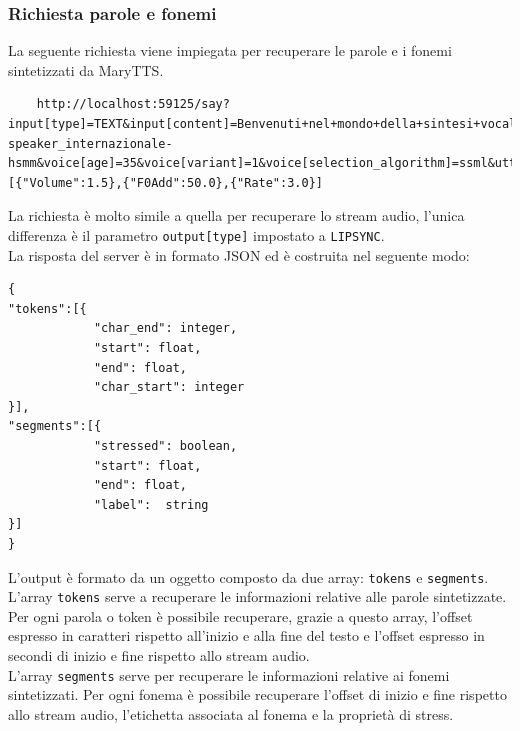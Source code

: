 \subsubsection{Richiesta parole e fonemi}
La seguente richiesta viene impiegata per recuperare le parole e i fonemi sintetizzati da MaryTTS.
\begin{lstlisting}
	http://localhost:59125/say?input[type]=TEXT&input[content]=Benvenuti+nel+mondo+della+sintesi+vocale.&input[locale]=it&output[type]=LIPSYNC&voice[gender]=male&voice[name]=istc-speaker_internazionale-hsmm&voice[age]=35&voice[variant]=1&voice[selection_algorithm]=ssml&utterance[effects]=[{"Volume":1.5},{"F0Add":50.0},{"Rate":3.0}]
\end{lstlisting}
La richiesta è molto simile a quella per recuperare lo stream audio, l'unica differenza è il parametro \texttt{output[type]} impostato a \texttt{LIPSYNC}.\\
La risposta del server è in formato JSON ed è costruita nel seguente modo:
\lstset{language=html,
	basicstyle=\ttfamily,
	columns=fullflexible,
	showstringspaces=false,
	breaklines=true }
\begin{lstlisting}
{
"tokens":[{ 
			"char_end": integer, 
			"start": float,
			"end": float,
			"char_start": integer
}],
"segments":[{ 
			"stressed": boolean, 
			"start": float,
			"end": float,
			"label":  string
}]
}

\end{lstlisting}
L'output è formato da un oggetto composto da due array: \texttt{tokens} e \texttt{segments}.\\
L'array \texttt{tokens} serve a recuperare le informazioni relative alle parole sintetizzate.
Per ogni parola o token è possibile recuperare, grazie a questo array, l'offset espresso in caratteri rispetto all'inizio e alla fine del testo e l'offset espresso in secondi di inizio e fine rispetto allo stream audio.\\
L'array \texttt{segments} serve per recuperare le informazioni relative ai fonemi sintetizzati.
Per ogni fonema è possibile recuperare l'offset di inizio e fine rispetto allo stream audio, l'etichetta associata al fonema e la proprietà di stress.

\newpage
